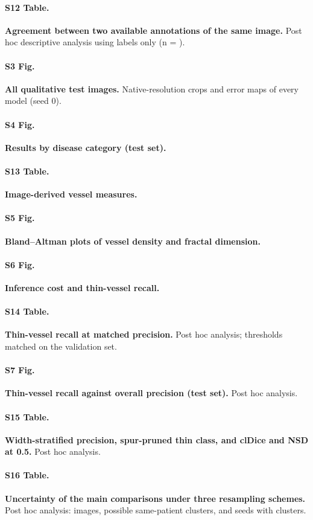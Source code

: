 \paragraph*{S12 Table.}
\label{si:agreement}
{\bf Agreement between two available annotations of the same image.} Post hoc descriptive analysis using labels only
(n = \AgreeNPairs{}).

\paragraph*{S3 Fig.}
\label{si:qualall}
{\bf All qualitative test images.} Native-resolution crops and error maps of every model (seed 0).

\paragraph*{S4 Fig.}
\label{si:diseasefig}
{\bf Results by disease category (test set).}

\paragraph*{S13 Table.}
\label{si:vessel}
{\bf Image-derived vessel measures.}

\paragraph*{S5 Fig.}
\label{si:blandaltman}
{\bf Bland--Altman plots of vessel density and fractal dimension.}

\paragraph*{S6 Fig.}
\label{si:costfig}
{\bf Inference cost and thin-vessel recall.}

\paragraph*{S14 Table.}
\label{si:matched}
{\bf Thin-vessel recall at matched precision.} Post hoc analysis; thresholds matched on the validation set.

\paragraph*{S7 Fig.}
\label{si:precthin}
{\bf Thin-vessel recall against overall precision (test set).} Post hoc analysis.

\paragraph*{S15 Table.}
\label{si:precision}
{\bf Width-stratified precision, spur-pruned thin class, and clDice and NSD at 0.5.} Post hoc analysis.

\paragraph*{S16 Table.}
\label{si:stats}
{\bf Uncertainty of the main comparisons under three resampling schemes.} Post hoc analysis: images, possible
same-patient clusters, and seeds with clusters.
